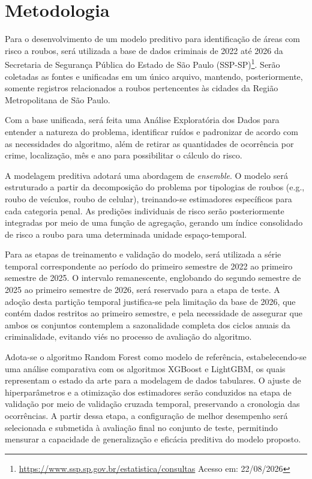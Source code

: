 \documentclass[12pt]{article}
\begin{document}
\section{Metodologia}
Para o desenvolvimento de um modelo preditivo para identificação de áreas com risco a roubos, será utilizada a base de dados criminais de 2022 até 2026 da Secretaria de Segurança Pública do Estado de São Paulo (SSP-SP)\footnote{\url{https://www.ssp.sp.gov.br/estatistica/consultas} Acesso em: 22/08/2026}. Serão coletadas as fontes e unificadas em um único arquivo, mantendo, posteriormente, somente registros relacionados a roubos pertencentes às cidades da Região Metropolitana de São Paulo.

Com a base unificada, será feita uma Análise Exploratória dos Dados para entender a natureza do problema, identificar ruídos e padronizar de acordo com as necessidades do algoritmo, além de retirar as quantidades de ocorrência por crime, localização, mês e ano para possibilitar o cálculo do risco.

A modelagem preditiva adotará uma abordagem de \textit{ensemble}. O modelo será estruturado a partir da decomposição do problema por tipologias de roubos (e.g., roubo de veículos, roubo de celular), treinando-se estimadores específicos para cada categoria penal. As predições individuais de risco serão posteriormente integradas por meio de uma função de agregação, gerando um índice consolidado de risco a roubo para uma determinada unidade espaço-temporal.

Para as etapas de treinamento e validação do modelo, será utilizada a série temporal correspondente ao período do primeiro semestre de 2022 ao primeiro semestre de 2025. O intervalo remanescente, englobando do segundo semestre de 2025 ao primeiro semestre de 2026, será reservado para a etapa de teste. A adoção desta partição temporal justifica-se pela limitação da base de 2026, que contém dados restritos ao primeiro semestre, e pela necessidade de assegurar que ambos os conjuntos contemplem a sazonalidade completa dos ciclos anuais da criminalidade, evitando viés no processo de avaliação do algoritmo.

Adota-se o algoritmo Random Forest como modelo de referência, estabelecendo-se uma análise comparativa com os algoritmos XGBoost e LightGBM, os quais representam o estado da arte para a modelagem de dados tabulares. O ajuste de hiperparâmetros e a otimização dos estimadores serão conduzidos na etapa de validação por meio de validação cruzada temporal, preservando a cronologia das ocorrências. A partir dessa etapa, a configuração de melhor desempenho será selecionada e submetida à avaliação final no conjunto de teste, permitindo mensurar a capacidade de generalização e eficácia preditiva do modelo proposto.
\end{document}

